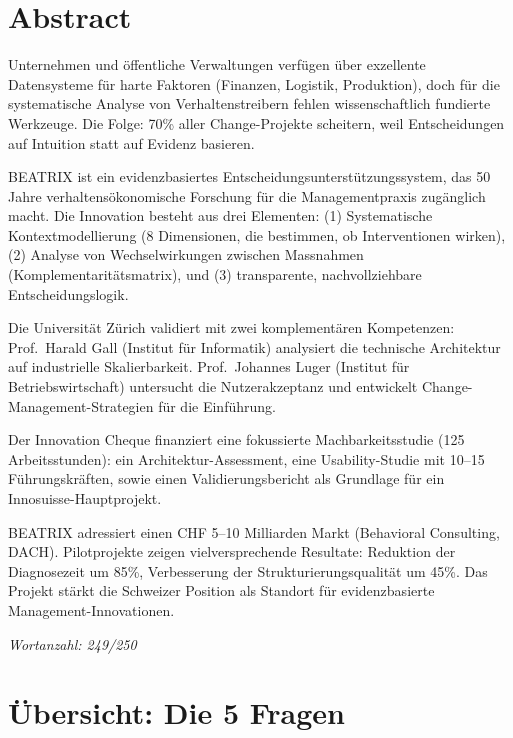 \documentclass[11pt,a4paper]{article}
\begin{document}
\section*{Abstract}

Unternehmen und öffentliche Verwaltungen verfügen über exzellente Datensysteme für harte Faktoren (Finanzen, Logistik, Produktion), doch für die systematische Analyse von Verhaltenstreibern fehlen wissenschaftlich fundierte Werkzeuge. Die Folge: 70\% aller Change-Projekte scheitern, weil Entscheidungen auf Intuition statt auf Evidenz basieren.

BEATRIX ist ein evidenzbasiertes Entscheidungsunterstützungssystem, das 50 Jahre verhaltensökonomische Forschung für die Managementpraxis zugänglich macht. Die Innovation besteht aus drei Elementen: (1) Systematische Kontextmodellierung (8 Dimensionen, die bestimmen, ob Interventionen wirken), (2) Analyse von Wechselwirkungen zwischen Massnahmen (Komplementaritätsmatrix), und (3) transparente, nachvollziehbare Entscheidungslogik.

Die Universität Zürich validiert mit zwei komplementären Kompetenzen: Prof.~Harald Gall (Institut für Informatik) analysiert die technische Architektur auf industrielle Skalierbarkeit. Prof.~Johannes Luger (Institut für Betriebswirtschaft) untersucht die Nutzerakzeptanz und entwickelt Change-Management-Strategien für die Einführung.

Der Innovation Cheque finanziert eine fokussierte Machbarkeitsstudie (125 Arbeitsstunden): ein Architektur-Assessment, eine Usability-Studie mit 10--15 Führungskräften, sowie einen Validierungsbericht als Grundlage für ein Innosuisse-Hauptprojekt.

BEATRIX adressiert einen CHF 5--10 Milliarden Markt (Behavioral Consulting, DACH). Pilotprojekte zeigen vielversprechende Resultate: Reduktion der Diagnosezeit um 85\%, Verbesserung der Strukturierungsqualität um 45\%. Das Projekt stärkt die Schweizer Position als Standort für evidenzbasierte Management-Innovationen.

\vspace{0.5cm}
\noindent\textit{Wortanzahl: 249/250}

\newpage

\section*{Übersicht: Die 5 Fragen}
\end{document}

